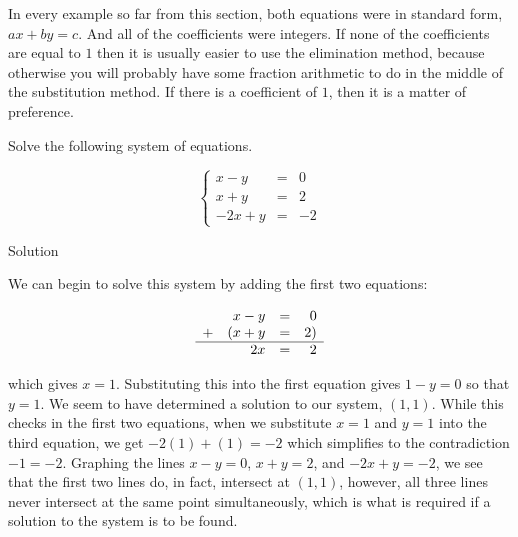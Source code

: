 In every example so far from this section, both equations were in standard form, $ax + by=c$. And all of the coefficients were integers. If none of the coefficients are equal to $1$ then it is usually easier to use the elimination method, because otherwise you will probably have some fraction arithmetic to do in the middle of the substitution method. If there is a coefficient of $1$, then it is a matter of preference.



\begin{example} \label{syst_lin_eq_elimination_ex4} 
Solve the following system of equations.

\[\left\{ \begin{array}{rcl} x - y &=& 0 \\ x + y &=& 2 \\ -2x + y &=& -2 \end{array} \right. \]


Solution 

We can begin to solve this system by adding the first two equations:  

\setlength{\extrarowheight}{2pt}
\[ \begin{array}{lrcr} & x - y & = & 0  \\ + & (x + y & = & 2 ) \\ \hline  & 2x & = & 2 \end{array}\]  
\setlength{\extrarowheight}{0pt}

which gives $x = 1$.  Substituting this into the first equation gives $1 - y = 0$ so that $y = 1$.  We seem to have determined a solution to our system, $(1,1)$.  While this checks in the first two equations, when we substitute $x=1$ and $y=1$ into the third equation, we get $-2(1) + (1) = -2$ which simplifies to the contradiction $-1 = -2$.  Graphing the lines $x-y=0$, $x+y = 2$, and $-2x+y=-2$, we see that the first two lines do, in fact, intersect at $(1,1)$, however, all three lines never intersect at the same point simultaneously, which is what is required if a solution to the system is to be found.


\end{example}
